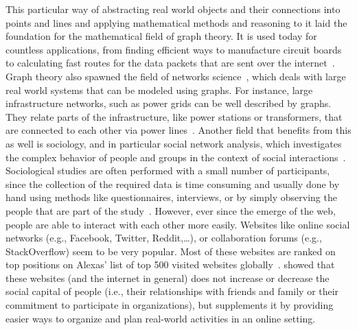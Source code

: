 This particular way of abstracting real world objects and their connections into points and lines and applying mathematical methods and reasoning to it laid the foundation for the mathematical field of graph theory.
It is used today for countless applications, from finding efficient ways to manufacture circuit boards~\cite{Cook2012} to calculating fast routes for the data packets that are sent over the internet~\cite{Wang1999}.
Graph theory also spawned the field of networks science~\cite{Newman2010}, which deals with large real world systems that can be modeled using graphs.
For instance, large infrastructure networks, such as power grids can be well described by graphs.
They relate parts of the infrastructure, like power stations or transformers, that are connected to each other via power lines~\cite{Watts1998}.
Another field that benefits from this as well is sociology, and in particular social network analysis, which investigates the complex behavior of people and groups in the context of social interactions~\cite{Newman2010}.
Sociological studies are often performed with a small number of participants, since the collection of the required data is time consuming and usually done by hand using methods like questionnaires, interviews, or by simply observing the people that are part of the study~\cite{Wasserman1994}.
However, ever since the emerge of the web, people are able to interact with each other more easily.
Websites like online social networks (e.g., Facebook, Twitter, Reddit,\ldots), or collaboration forums (e.g., StackOverflow) seem to be very popular.
Most of these websites are ranked on top positions on Alexas' list of top 500 visited websites globally~\cite{Alexa2017}.
\citet{Wellman2001} showed that these websites (and the internet in general) does not increase or decrease the social capital of people (i.e., their relationships with friends and family or their commitment to participate in organizations), but supplements it by providing easier ways to organize and plan real-world activities in an online setting.

